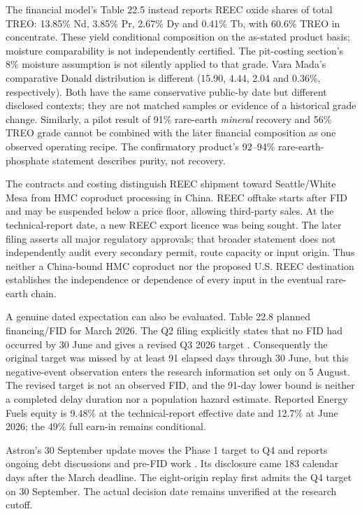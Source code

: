 \documentclass[11pt]{article}
\begin{document}
The financial model's Table 22.5 instead reports REEC oxide shares of total TREO: 13.85\% Nd, 3.85\% Pr, 2.67\% Dy and 0.41\% Tb, with 60.6\% TREO in concentrate. These yield conditional composition on the as-stated product basis; moisture comparability is not independently certified. The pit-costing section's 8\% moisture assumption is not silently applied to that grade. Vara Mada's comparative Donald distribution is different (15.90, 4.44, 2.04 and 0.36\%, respectively). Both have the same conservative public-by date but different disclosed contexts; they are not matched samples or evidence of a historical grade change. Similarly, a pilot result of 91\% rare-earth \emph{mineral} recovery and 56\% TREO grade cannot be combined with the later financial composition as one observed operating recipe. The confirmatory product's 92--94\% rare-earth-phosphate statement describes purity, not recovery.

The contracts and costing distinguish REEC shipment toward Seattle/White Mesa from HMC coproduct processing in China. REEC offtake starts after FID and may be suspended below a price floor, allowing third-party sales. At the technical-report date, a new REEC export licence was being sought. The later filing asserts all major regulatory approvals; that broader statement does not independently audit every secondary permit, route capacity or input origin. Thus neither a China-bound HMC coproduct nor the proposed U.S. REEC destination establishes the independence or dependence of every input in the eventual rare-earth chain.

A genuine dated expectation can also be evaluated. Table 22.8 planned financing/FID for March 2026. The Q2 filing explicitly states that no FID had occurred by 30 June and gives a revised Q3 2026 target \citep{EFQ22026}. Consequently the original target was missed by at least 91 elapsed days through 30 June, but this negative-event observation enters the research information set only on 5 August. The revised target is not an observed FID, and the 91-day lower bound is neither a completed delay duration nor a population hazard estimate. Reported Energy Fuels equity is 9.48\% at the technical-report effective date and 12.7\% at June 2026; the 49\% full earn-in remains conditional.

Astron's 30 September update moves the Phase 1 target to Q4 and reports ongoing debt discussions and pre-FID work \citep{AstronDonald2026}. Its disclosure came 183 calendar days after the March deadline. The eight-origin replay first admits the Q4 target on 30 September. The actual decision date remains unverified at the research cutoff.
\end{document}
